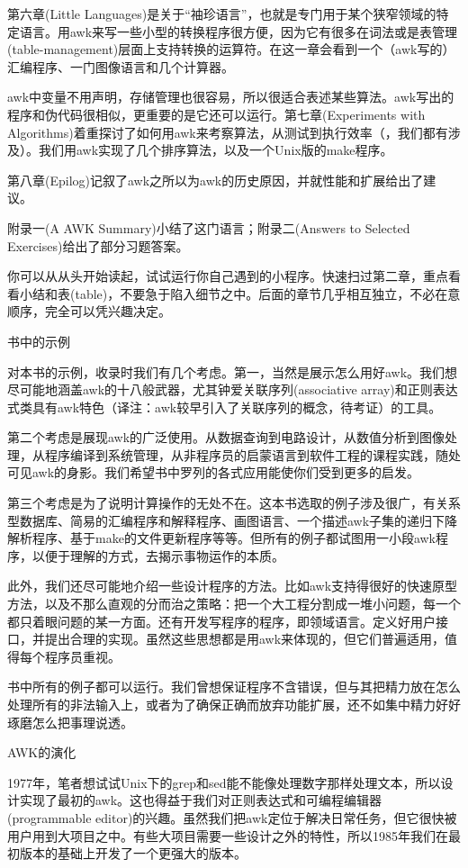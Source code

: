 第六章(Little Languages)是关于“袖珍语言”，也就是专门用于某个狭窄领域的特定语言。用awk来写一些小型的转换程序很方便，因为它有很多在词法或是表管理(table-management)层面上支持转换的运算符。在这一章会看到一个（awk写的）汇编程序、一门图像语言和几个计算器。

awk中变量不用声明，存储管理也很容易，所以很适合表述某些算法。awk写出的程序和伪代码很相似，更重要的是它还可以运行。第七章(Experiments with Algorithms)着重探讨了如何用awk来考察算法，从测试到执行效率（，我们都有涉及）。我们用awk实现了几个排序算法，以及一个Unix版的make程序。

第八章(Epilog)记叙了awk之所以为awk的历史原因，并就性能和扩展给出了建议。

附录一(A AWK Summary)小结了这门语言；附录二(Answers to Selected Exercises)给出了部分习题答案。

你可以从从头开始读起，试试运行你自己遇到的小程序。快速扫过第二章，重点看看小结和表(table)，不要急于陷入细节之中。后面的章节几乎相互独立，不必在意顺序，完全可以凭兴趣决定。

书中的示例

对本书的示例，收录时我们有几个考虑。第一，当然是展示怎么用好awk。我们想尽可能地涵盖awk的十八般武器，尤其钟爱关联序列(associative array)和正则表达式类具有awk特色（译注：awk较早引入了关联序列的概念，待考证）的工具。

第二个考虑是展现awk的广泛使用。从数据查询到电路设计，从数值分析到图像处理，从程序编译到系统管理，从非程序员的启蒙语言到软件工程的课程实践，随处可见awk的身影。我们希望书中罗列的各式应用能使你们受到更多的启发。

第三个考虑是为了说明计算操作的无处不在。这本书选取的例子涉及很广，有关系型数据库、简易的汇编程序和解释程序、画图语言、一个描述awk子集的递归下降解析程序、基于make的文件更新程序等等。但所有的例子都试图用一小段awk程序，以便于理解的方式，去揭示事物运作的本质。

此外，我们还尽可能地介绍一些设计程序的方法。比如awk支持得很好的快速原型方法，以及不那么直观的分而治之策略：把一个大工程分割成一堆小问题，每一个都只着眼问题的某一方面。还有开发写程序的程序，即领域语言。定义好用户接口，并提出合理的实现。虽然这些思想都是用awk来体现的，但它们普遍适用，值得每个程序员重视。

书中所有的例子都可以运行。我们曾想保证程序不含错误，但与其把精力放在怎么处理所有的非法输入上，或者为了确保正确而放弃功能扩展，还不如集中精力好好琢磨怎么把事理说透。

AWK的演化

1977年，笔者想试试Unix下的grep和sed能不能像处理数字那样处理文本，所以设计实现了最初的awk。这也得益于我们对正则表达式和可编程编辑器(programmable editor)的兴趣。虽然我们把awk定位于解决日常任务，但它很快被用户用到大项目之中。有些大项目需要一些设计之外的特性，所以1985年我们在最初版本的基础上开发了一个更强大的版本。

